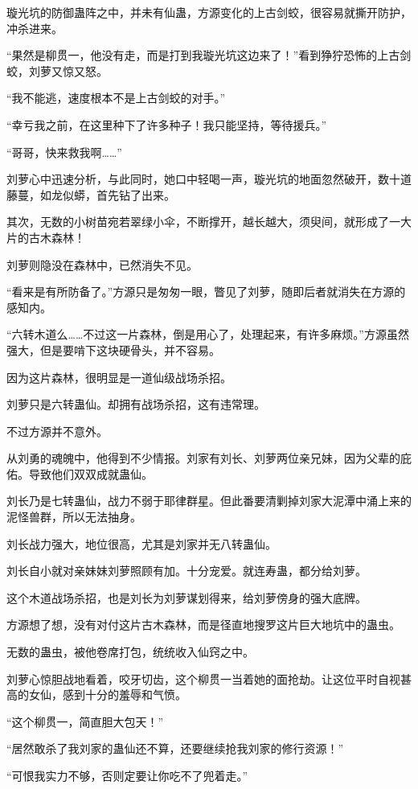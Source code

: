 \begin{this_body}
璇光坑的防御蛊阵之中，并未有仙蛊，方源变化的上古剑蛟，很容易就撕开防护，冲杀进来。

“果然是柳贯一，他没有走，而是打到我璇光坑这边来了！”看到狰狞恐怖的上古剑蛟，刘萝又惊又怒。

“我不能逃，速度根本不是上古剑蛟的对手。”

“幸亏我之前，在这里种下了许多种子！我只能坚持，等待援兵。”

“哥哥，快来救我啊……”

刘萝心中迅速分析，与此同时，她口中轻喝一声，璇光坑的地面忽然破开，数十道藤蔓，如龙似蟒，首先钻了出来。

其次，无数的小树苗宛若翠绿小伞，不断撑开，越长越大，须臾间，就形成了一大片的古木森林！

刘萝则隐没在森林中，已然消失不见。

“看来是有所防备了。”方源只是匆匆一眼，瞥见了刘萝，随即后者就消失在方源的感知内。

“六转木道么……不过这一片森林，倒是用心了，处理起来，有许多麻烦。”方源虽然强大，但是要啃下这块硬骨头，并不容易。

因为这片森林，很明显是一道仙级战场杀招。

刘萝只是六转蛊仙。却拥有战场杀招，这有违常理。

不过方源并不意外。

从刘勇的魂魄中，他得到不少情报。刘家有刘长、刘萝两位亲兄妹，因为父辈的庇佑。导致他们双双成就蛊仙。

刘长乃是七转蛊仙，战力不弱于耶律群星。但此番要清剿掉刘家大泥潭中涌上来的泥怪兽群，所以无法抽身。

刘长战力强大，地位很高，尤其是刘家并无八转蛊仙。

刘长自小就对亲妹妹刘萝照顾有加。十分宠爱。就连寿蛊，都分给刘萝。

这个木道战场杀招，也是刘长为刘萝谋划得来，给刘萝傍身的强大底牌。

方源想了想，没有对付这片古木森林，而是径直地搜罗这片巨大地坑中的蛊虫。

无数的蛊虫，被他卷席打包，统统收入仙窍之中。

刘萝心惊胆战地看着，咬牙切齿，这个柳贯一当着她的面抢劫。让这位平时自视甚高的女仙，感到十分的羞辱和气愤。

“这个柳贯一，简直胆大包天！”

“居然敢杀了我刘家的蛊仙还不算，还要继续抢我刘家的修行资源！”

“可恨我实力不够，否则定要让你吃不了兜着走。”


\end{this_body}
